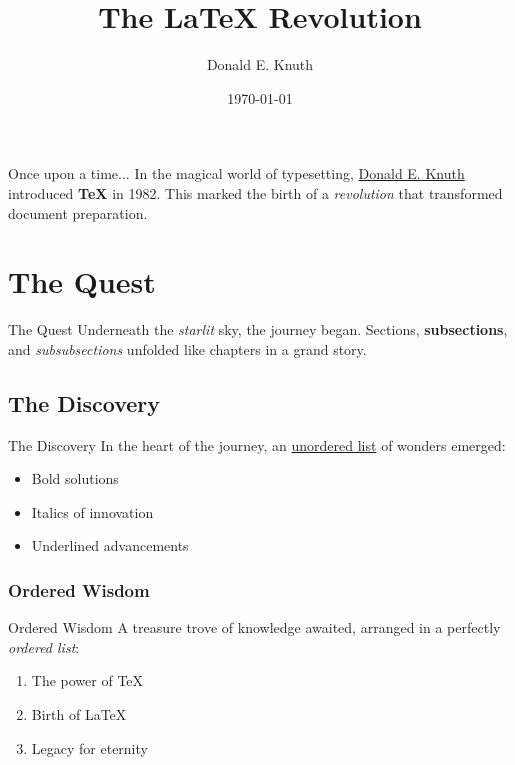\documentclass{beamer}
\title{The LaTeX Revolution}
\author{Donald E. Knuth}
\date{\today}
\begin{document}
	
	\begin{frame}
		\titlepage
	\end{frame}
	
	\begin{frame}{Once upon a time...}
		In the magical world of typesetting, \underline{Donald E. Knuth} introduced \textbf{TeX} in 1982. This marked the birth of a \textit{revolution} that transformed document preparation.
	\end{frame}
	
	\section{The Quest}
	
	\begin{frame}{The Quest}
		Underneath the \textit{starlit} sky, the journey began. \noindent{}Sections, \textbf{subsections}, and \textit{subsubsections} unfolded like chapters in a grand story.
	\end{frame}
	
	\subsection{The Discovery}
	
	\begin{frame}{The Discovery}
		In the heart of the journey, an \underline{unordered list} of wonders emerged:
		\begin{itemize}
			\item Bold solutions
			\item Italics of innovation
			\item Underlined advancements
		\end{itemize}
	\end{frame}
	
	\subsubsection{Ordered Wisdom}
	
	\begin{frame}{Ordered Wisdom}
		A treasure trove of knowledge awaited, arranged in a perfectly \textit{ordered list}:
		\begin{enumerate}
			\item The power of TeX
			\item Birth of LaTeX
			\item Legacy for eternity
		\end{enumerate}
	\end{frame}
	
\end{document}
